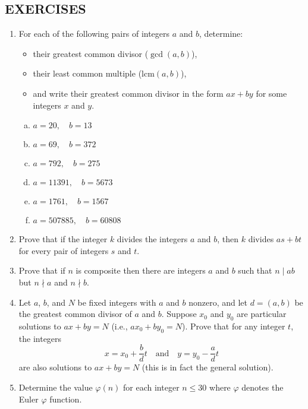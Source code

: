 \subsection*{\centering EXERCISES}
\begin{enumerate}
    \item For each of the following pairs of integers $a$ and $b$, determine:
    \begin{itemize}
        \item their greatest common divisor ($\gcd(a,b)$),
        \item their least common multiple ($\text{lcm}(a,b)$),
        \item and write their greatest common divisor in the form $ax + by$ for some integers $x$ and $y$.
    \end{itemize}

    \begin{enumerate}[(a)]
        \item $a = 20,\quad b = 13$
        \item $a = 69,\quad b = 372$
        \item $a = 792,\quad b = 275$
        \item $a = 11391,\quad b = 5673$
        \item $a = 1761,\quad b = 1567$
        \item $a = 507885,\quad b = 60808$
    \end{enumerate}

    \item Prove that if the integer $k$ divides the integers $a$ and $b$, then $k$ divides $as + bt$ for every pair of integers $s$ and $t$.
    \item Prove that if $n$ is composite then there are integers $a$ and $b$ such that $n \mid ab$ but $n \nmid a$ and $n \nmid b$.

    \item Let $a$, $b$, and $N$ be fixed integers with $a$ and $b$ nonzero, and let $d = (a, b)$ be the greatest common divisor of $a$ and $b$. Suppose $x_0$ and $y_0$ are particular solutions to $ax + by = N$ (i.e., $ax_0 + by_0 = N$). Prove that for any integer $t$, the integers
    \[
    x = x_0 + \frac{b}{d}t \quad \text{and} \quad y = y_0 - \frac{a}{d}t
    \]
    are also solutions to $ax + by = N$ (this is in fact the general solution).

    \item Determine the value $\varphi(n)$ for each integer $n \leq 30$ where $\varphi$ denotes the Euler $\varphi$ function.


\end{enumerate}
